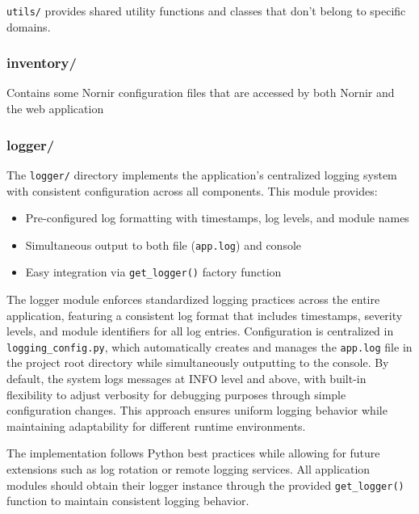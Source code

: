         \texttt{utils/} provides shared utility functions and classes that don't belong to specific domains.

    \subsubsection{inventory/}
        Contains some Nornir configuration files that are accessed by both Nornir and the web application

    \subsubsection{logger/}
        The \texttt{logger/} directory implements the application's centralized logging system with consistent 
        configuration across all components. This module provides:

        \begin{itemize}
            \item Pre-configured log formatting with timestamps, log levels, and module names
            \item Simultaneous output to both file (\texttt{app.log}) and console
            \item Easy integration via \texttt{get\_logger()} factory function
        \end{itemize}

        The logger module enforces standardized logging practices across the entire application, featuring a consistent 
        log format that includes timestamps, severity levels, and module identifiers for all log entries. Configuration is 
        centralized in \texttt{logging\_config.py}, which automatically creates and manages the \texttt{app.log} file in the 
        project root directory while simultaneously outputting to the console. By default, the system logs messages at INFO 
        level and above, with built-in flexibility to adjust verbosity for debugging purposes through simple configuration 
        changes. This approach ensures uniform logging behavior while maintaining adaptability for different runtime 
        environments.

        The implementation follows Python best practices while allowing for future extensions such as log rotation 
        or remote logging services. All application modules should obtain their logger instance through the provided 
        \texttt{get\_logger()} function to maintain consistent logging behavior.

